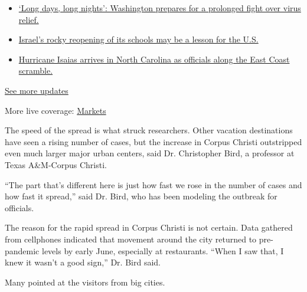 \begin{itemize}
\tightlist
\item
  \href{https://www.nytimes3xbfgragh.onion/2020/08/04/world/coronavirus-covid-19.html?action=click\&pgtype=Article\&state=default\&region=MAIN_CONTENT_1\&context=storylines_live_updates\#link-6b644638}{`Long
  days, long nights': Washington prepares for a prolonged fight over
  virus relief.}
\item
  \href{https://www.nytimes3xbfgragh.onion/2020/08/04/world/coronavirus-covid-19.html?action=click\&pgtype=Article\&state=default\&region=MAIN_CONTENT_1\&context=storylines_live_updates\#link-7af9fca0}{Israel's
  rocky reopening of its schools may be a lesson for the U.S.}
\item
  \href{https://www.nytimes3xbfgragh.onion/2020/08/04/world/coronavirus-covid-19.html?action=click\&pgtype=Article\&state=default\&region=MAIN_CONTENT_1\&context=storylines_live_updates\#link-33bf9168}{Hurricane
  Isaias arrives in North Carolina as officials along the East Coast
  scramble.}
\end{itemize}

\href{https://www.nytimes3xbfgragh.onion/2020/08/04/world/coronavirus-covid-19.html?action=click\&pgtype=Article\&state=default\&region=MAIN_CONTENT_1\&context=storylines_live_updates}{See
more updates}

More live coverage:
\href{https://www.nytimes3xbfgragh.onion/live/2020/08/03/business/stock-market-today-coronavirus?action=click\&pgtype=Article\&state=default\&region=MAIN_CONTENT_1\&context=storylines_live_updates}{Markets}

The speed of the spread is what struck researchers. Other vacation
destinations have seen a rising number of cases, but the increase in
Corpus Christi outstripped even much larger major urban centers, said
Dr. Christopher Bird, a professor at Texas A\&M-Corpus Christi.

``The part that's different here is just how fast we rose in the number
of cases and how fast it spread,'' said Dr. Bird, who has been modeling
the outbreak for officials.

The reason for the rapid spread in Corpus Christi is not certain. Data
gathered from cellphones indicated that movement around the city
returned to pre-pandemic levels by early June, especially at
restaurants. ``When I saw that, I knew it wasn't a good sign,'' Dr. Bird
said.

Many pointed at the visitors from big cities.

